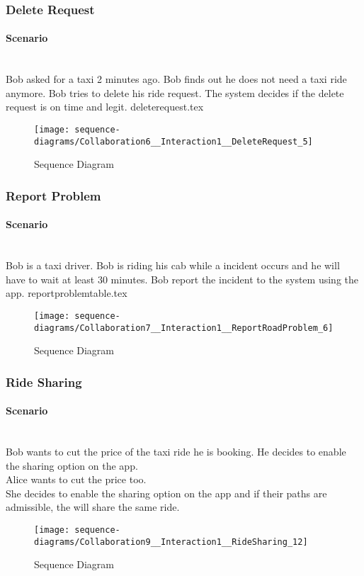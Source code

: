\subsubsection{Delete Request} 
\label{ssub:deleterequest_scenario}
\paragraph{Scenario} \hfill \\
Bob asked for a taxi 2 minutes ago. Bob finds out he does not need a taxi ride anymore. Bob tries to delete his ride request. The system decides if the delete request is on time and legit.
{deleterequest.tex}
\newpage
\vfill
\begin{figure}
\caption{Sequence Diagram}
\texttt{[image: sequence-diagrams/Collaboration6\_\_Interaction1\_\_DeleteRequest\_5]}
\centering
\end{figure}
\vfill
\clearpage

\subsubsection{Report Problem} 
\label{ssub:reportproblem_scenario}
\paragraph{Scenario} \hfill \\
Bob is a taxi driver. Bob is riding his cab while a incident occurs and he will have to wait at least 30 minutes. Bob report the incident to the system using the app.
{reportproblemtable.tex}
\newpage
\vfill
\begin{figure}
\caption{Sequence Diagram}
\texttt{[image: sequence-diagrams/Collaboration7\_\_Interaction1\_\_ReportRoadProblem\_6]}
\centering
\end{figure}
\vfill
\clearpage

\subsubsection{Ride Sharing} 
\label{ssub:ridesharing_scenario}
\paragraph{Scenario} \hfill \\
Bob wants to cut the price of the taxi ride he is booking. He decides to enable the sharing option on the app.\\
Alice wants to cut the price too.\\
She decides to enable the sharing option on the app and if their paths are admissible, the will share the same ride.
\newpage
\vfill
\begin{figure}
\caption{Sequence Diagram}
\texttt{[image: sequence-diagrams/Collaboration9\_\_Interaction1\_\_RideSharing\_12]}
\centering
\end{figure}
\vfill
\clearpage

